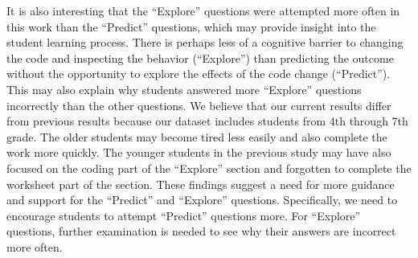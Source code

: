 \documentclass[sigconf,manuscript,review,anonymous]{acmart} %
\def\ts{TIPP\&SEE}
\begin{document}
It is also interesting that the ``Explore'' questions were attempted more often in this work than the ``Predict'' questions, which may provide insight into the student learning process. There is perhaps less of a cognitive barrier to changing the code and inspecting the behavior (``Explore'') than predicting the outcome without the opportunity to explore the effects of the code change (``Predict''). This may also explain why students answered more ``Explore'' questions incorrectly than the other questions. We believe that our current results differ from previous results \cite{franklin2020exploring} because our dataset includes students from 4th through 7th grade. The older students may become tired less easily and also complete the work more quickly. The younger students in the previous study may have also focused on the coding part of the ``Explore'' section and forgotten to complete the worksheet part of the section. These findings suggest a need for more guidance and support for the ``Predict'' and ``Explore'' questions. Specifically, we need to encourage students to attempt ``Predict'' questions more. For ``Explore'' questions, further examination is needed to see why their answers are incorrect more often.

\end{document}
